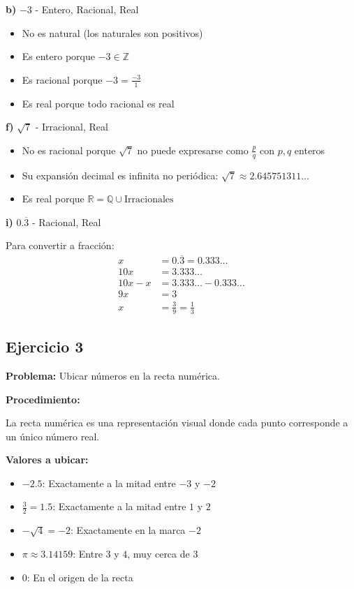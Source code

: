 \textbf{b)} $-3$ - Entero, Racional, Real
\begin{itemize}
    \item No es natural (los naturales son positivos)
    \item Es entero porque $-3 \in \mathbb{Z}$
    \item Es racional porque $-3 = \frac{-3}{1}$
    \item Es real porque todo racional es real
\end{itemize}

\textbf{f)} $\sqrt{7}$ - Irracional, Real
\begin{itemize}
    \item No es racional porque $\sqrt{7}$ no puede expresarse como $\frac{p}{q}$ con $p, q$ enteros
    \item Su expansión decimal es infinita no periódica: $\sqrt{7} \approx 2.645751311\ldots$
    \item Es real porque $\mathbb{R} = \mathbb{Q} \cup \text{Irracionales}$
\end{itemize}

\textbf{i)} $0.\overline{3}$ - Racional, Real

Para convertir a fracción:
\begin{align}
x &= 0.\overline{3} = 0.333\ldots\\
10x &= 3.333\ldots\\
10x - x &= 3.333\ldots - 0.333\ldots\\
9x &= 3\\
x &= \frac{3}{9} = \frac{1}{3}
\end{align}

\subsection*{Ejercicio 3}

\textbf{Problema:} Ubicar números en la recta numérica.

\textbf{Procedimiento:}

La recta numérica es una representación visual donde cada punto corresponde a un único número real.

\textbf{Valores a ubicar:}
\begin{itemize}
    \item $-2.5$: Exactamente a la mitad entre $-3$ y $-2$
    \item $\frac{3}{2} = 1.5$: Exactamente a la mitad entre $1$ y $2$
    \item $-\sqrt{4} = -2$: Exactamente en la marca $-2$
    \item $\pi \approx 3.14159$: Entre $3$ y $4$, muy cerca de $3$
    \item $0$: En el origen de la recta
\end{itemize}

